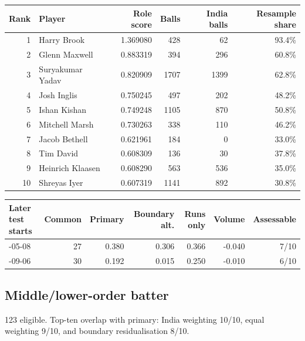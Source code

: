 \begin{center}
\begin{tabularx}{\linewidth}{r>{\raggedright\arraybackslash}Xrrrr}
\toprule
Rank & Player & Role score & Balls & India balls & Resample share \\
\midrule
1 & Harry Brook & 1.369080 & 428 & 62 & 93.4\% \\
2 & Glenn Maxwell & 0.883319 & 394 & 296 & 60.8\% \\
3 & Suryakumar Yadav & 0.820909 & 1707 & 1399 & 62.8\% \\
4 & Josh Inglis & 0.750245 & 497 & 202 & 48.2\% \\
5 & Ishan Kishan & 0.749248 & 1105 & 870 & 50.8\% \\
6 & Mitchell Marsh & 0.730263 & 338 & 110 & 46.2\% \\
7 & Jacob Bethell & 0.621961 & 184 & 0 & 33.0\% \\
8 & Tim David & 0.608309 & 136 & 30 & 37.8\% \\
9 & Heinrich Klaasen & 0.608290 & 563 & 536 & 35.0\% \\
10 & Shreyas Iyer & 0.607319 & 1141 & 892 & 30.8\% \\
\bottomrule
\end{tabularx}
\end{center}

\begin{center}
\begin{tabularx}{\linewidth}{>{\raggedright\arraybackslash}Xrrrrrr}
\toprule
Later test starts & Common & Primary & Boundary alt. & Runs only & Volume & Assessable \\
\midrule
2024-05-08 & 27 & 0.380 & 0.306 & 0.366 & -0.040 & 7/10 \\
2025-09-06 & 30 & 0.192 & 0.015 & 0.250 & -0.010 & 6/10 \\
\bottomrule
\end{tabularx}
\end{center}

\subsection{Middle/lower-order batter}

123 eligible. Top-ten overlap with primary: India weighting 10/10, equal weighting 9/10, and boundary residualisation 8/10.


